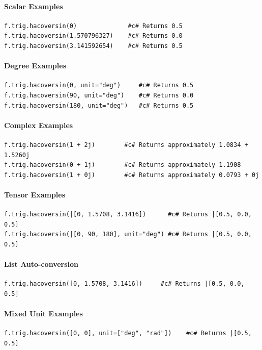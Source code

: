 \paragraph{Scalar Examples}
\begin{verbatim}
f.trig.hacoversin(0)              #c# Returns 0.5
f.trig.hacoversin(1.570796327)    #c# Returns 0.0
f.trig.hacoversin(3.141592654)    #c# Returns 0.5
\end{verbatim}

\paragraph{Degree Examples}
\begin{verbatim}
f.trig.hacoversin(0, unit="deg")     #c# Returns 0.5
f.trig.hacoversin(90, unit="deg")    #c# Returns 0.0
f.trig.hacoversin(180, unit="deg")   #c# Returns 0.5
\end{verbatim}

\paragraph{Complex Examples}
\begin{verbatim}
f.trig.hacoversin(1 + 2j)        #c# Returns approximately 1.0834 + 1.5260j
f.trig.hacoversin(0 + 1j)        #c# Returns approximately 1.1908
f.trig.hacoversin(1 + 0j)        #c# Returns approximately 0.0793 + 0j
\end{verbatim}

\paragraph{Tensor Examples}
\begin{verbatim}
f.trig.hacoversin(|[0, 1.5708, 3.1416])      #c# Returns |[0.5, 0.0, 0.5]
f.trig.hacoversin(|[0, 90, 180], unit="deg") #c# Returns |[0.5, 0.0, 0.5]
\end{verbatim}

\paragraph{List Auto-conversion}
\begin{verbatim}
f.trig.hacoversin([0, 1.5708, 3.1416])     #c# Returns |[0.5, 0.0, 0.5]
\end{verbatim}

\paragraph{Mixed Unit Examples}
\begin{verbatim}
f.trig.hacoversin([0, 0], unit=["deg", "rad"])    #c# Returns |[0.5, 0.5]
\end{verbatim}

